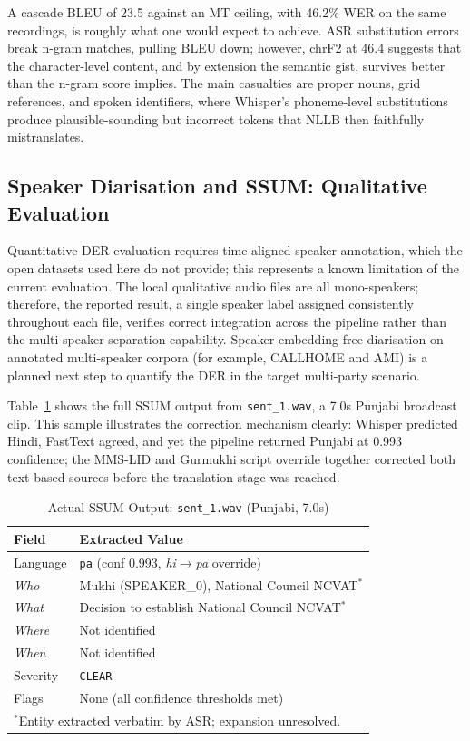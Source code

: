 \documentclass[conference]{IEEEtran}
\begin{document}
A cascade BLEU of 23.5 against an MT ceiling, with 46.2\% WER on the same recordings, is roughly what one would expect to achieve. ASR substitution errors break n-gram matches, pulling BLEU down; however, chrF2 at 46.4 suggests that the character-level content, and by extension the semantic gist, survives better than the n-gram score implies. The main casualties are proper nouns, grid references, and spoken identifiers, where Whisper's phoneme-level substitutions produce plausible-sounding but incorrect tokens that NLLB then faithfully mistranslates.

\subsection{Speaker Diarisation and SSUM: Qualitative Evaluation}
\label{sec:isum_eval}

Quantitative DER evaluation requires time-aligned speaker annotation, which the open datasets used here do not provide; this represents a known limitation of the current evaluation. The local qualitative audio files are all mono-speakers; therefore, the reported result, a single speaker label assigned consistently throughout each file, verifies correct integration across the pipeline rather than the multi-speaker separation capability. Speaker embedding-free diarisation on annotated multi-speaker corpora (for example, CALLHOME and AMI) is a planned next step to quantify the DER in the target multi-party scenario.

Table~\ref{tab:isum_example} shows the full SSUM output from \texttt{sent\_1.wav}, a 7.0s Punjabi broadcast clip. This sample illustrates the correction mechanism clearly: Whisper predicted Hindi, FastText agreed, and yet the pipeline returned Punjabi at 0.993 confidence; the MMS-LID and Gurmukhi script override together corrected both text-based sources before the translation stage was reached.

\begin{table}[htbp]
\caption{Actual SSUM Output: \texttt{sent\_1.wav} (Punjabi, 7.0s)}
\label{tab:isum_example}
\begin{center}
\begin{tabular}{p{1.5cm}p{5.8cm}}
\toprule
\textbf{Field} & \textbf{Extracted Value} \\
\midrule
Language   & \texttt{pa} (conf 0.993, \textit{hi}$\rightarrow$\textit{pa} override) \\
\textit{Who}   & Mukhi (SPEAKER\_0), National Council NCVAT$^*$ \\
\textit{What}  & Decision to establish National Council NCVAT$^*$ \\
\textit{Where} & Not identified \\
\textit{When}  & Not identified \\
Severity       & \texttt{CLEAR} \\
Flags          & None (all confidence thresholds met) \\
\midrule
\multicolumn{2}{l}{\footnotesize $^*$Entity extracted verbatim by ASR; expansion unresolved.} \\
\bottomrule
\end{tabular}
\end{center}
\end{table}
\end{document}
